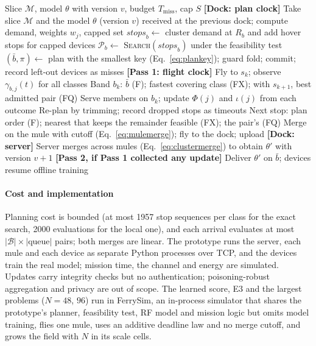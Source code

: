 \documentclass[conference]{IEEEtran}
\newcommand{\sysname}{FeRRy}
\newcommand{\bbar}{\bar{b}}
\begin{document}
\begin{algorithm}[t]
\caption{One \sysname{} mission round}
\label{alg:mission}
\begin{algorithmic}[1]
\Require Slice $\mathcal{M}$, model $\theta$ with version $v$, budget $T_{\mathrm{miss}}$, cap $S$
\Statex \textbf{[Dock: plan clock]}
\State Take slice $\mathcal{M}$ and the model $\theta$ (version $v$) received at the previous dock; compute demand, weights $w_j$, capped set
  \State $\textit{stops}_b\gets$ cluster demand at $R_b$ and add hover stops for capped devices
  \State $\mathcal{P}_b\gets$ \textsc{Search}$(\textit{stops}_b)$ under the feasibility test
\EndFor
\State $(\bbar,\pi)\gets$ plan with the smallest key (Eq.~\ref{eq:plankey}); guard fold; commit; record left-out devices as misses
\Statex \textbf{[Pass 1: flight clock]}
  \State Fly to $s_k$; observe $\gamma_{b,j}(t)$ for all classes
  \State Band $b_k$: $\bbar$ (F); fastest covering class (FX); with $s_{k+1}$, best admitted pair (FQ)
  \State Serve members on $b_k$; update $\Phi(j)$ and $\iota(j)$ from each outcome
    \State Re-plan by trimming; record dropped stops as timeouts
  \EndIf
  \State Next stop: plan order (F); nearest that keeps the remainder feasible (FX); the pair's (FQ)
\EndFor
\State Merge on the mule with cutoff (Eq.~\ref{eq:mulemerge}); fly to the dock; upload
\Statex \textbf{[Dock: server]}
\State Server merges across mules (Eq.~\ref{eq:clustermerge}) to obtain $\theta'$ with version $v+1$
\Statex \textbf{[Pass 2, if Pass 1 collected any update]}
  \State Deliver $\theta'$ on $\bbar$; devices resume offline training
\EndFor
\end{algorithmic}
\end{algorithm}

\paragraph{Cost and implementation}
Planning cost is bounded (at most 1957 stop sequences per class for the exact
search, 2000 evaluations for the local one), and each arrival evaluates at most
$|\mathcal{B}|\times|\text{queue}|$ pairs; both merges are linear. The prototype
runs the server, each mule and each device as separate Python processes over TCP,
and the devices train the real model; mission time, the channel and energy are
simulated. Updates carry integrity checks but no authentication;
poisoning-robust aggregation and privacy are out of scope. The learned score, E3
and the largest problems ($N=48$, $96$) run in FerrySim, an in-process simulator
that shares the prototype's planner, feasibility test, RF model and mission logic
but omits model training, flies one mule, uses an additive deadline law and no
merge cutoff, and grows the field with $N$ in its scale cells.
\end{document}
